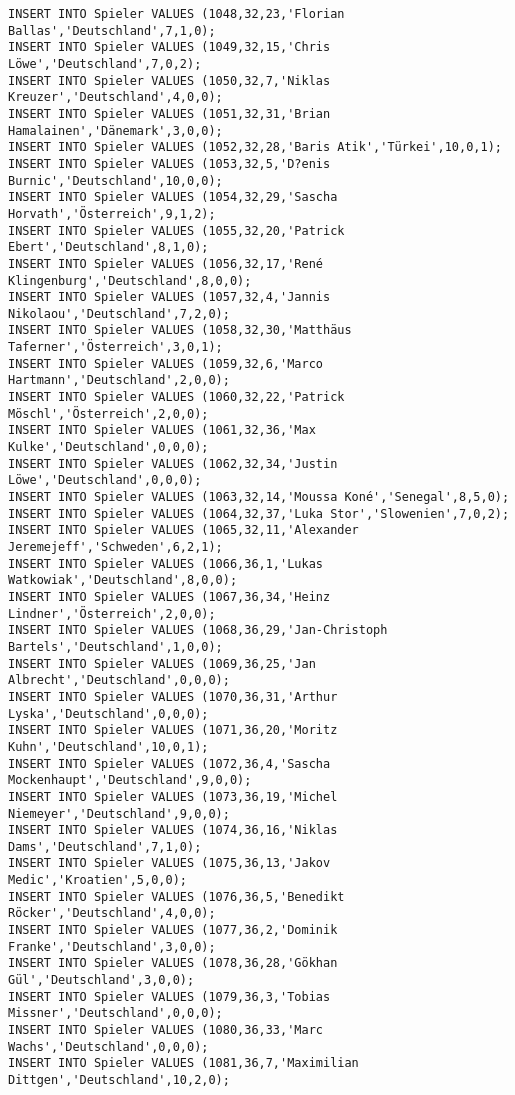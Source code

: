 \documentclass{bschlangaul-aufgabe}
\begin{document}
\begin{verbatim}
INSERT INTO Spieler VALUES (1048,32,23,'Florian Ballas','Deutschland',7,1,0);
INSERT INTO Spieler VALUES (1049,32,15,'Chris Löwe','Deutschland',7,0,2);
INSERT INTO Spieler VALUES (1050,32,7,'Niklas Kreuzer','Deutschland',4,0,0);
INSERT INTO Spieler VALUES (1051,32,31,'Brian Hamalainen','Dänemark',3,0,0);
INSERT INTO Spieler VALUES (1052,32,28,'Baris Atik','Türkei',10,0,1);
INSERT INTO Spieler VALUES (1053,32,5,'D?enis Burnic','Deutschland',10,0,0);
INSERT INTO Spieler VALUES (1054,32,29,'Sascha Horvath','Österreich',9,1,2);
INSERT INTO Spieler VALUES (1055,32,20,'Patrick Ebert','Deutschland',8,1,0);
INSERT INTO Spieler VALUES (1056,32,17,'René Klingenburg','Deutschland',8,0,0);
INSERT INTO Spieler VALUES (1057,32,4,'Jannis Nikolaou','Deutschland',7,2,0);
INSERT INTO Spieler VALUES (1058,32,30,'Matthäus Taferner','Österreich',3,0,1);
INSERT INTO Spieler VALUES (1059,32,6,'Marco Hartmann','Deutschland',2,0,0);
INSERT INTO Spieler VALUES (1060,32,22,'Patrick Möschl','Österreich',2,0,0);
INSERT INTO Spieler VALUES (1061,32,36,'Max Kulke','Deutschland',0,0,0);
INSERT INTO Spieler VALUES (1062,32,34,'Justin Löwe','Deutschland',0,0,0);
INSERT INTO Spieler VALUES (1063,32,14,'Moussa Koné','Senegal',8,5,0);
INSERT INTO Spieler VALUES (1064,32,37,'Luka Stor','Slowenien',7,0,2);
INSERT INTO Spieler VALUES (1065,32,11,'Alexander Jeremejeff','Schweden',6,2,1);
INSERT INTO Spieler VALUES (1066,36,1,'Lukas Watkowiak','Deutschland',8,0,0);
INSERT INTO Spieler VALUES (1067,36,34,'Heinz Lindner','Österreich',2,0,0);
INSERT INTO Spieler VALUES (1068,36,29,'Jan-Christoph Bartels','Deutschland',1,0,0);
INSERT INTO Spieler VALUES (1069,36,25,'Jan Albrecht','Deutschland',0,0,0);
INSERT INTO Spieler VALUES (1070,36,31,'Arthur Lyska','Deutschland',0,0,0);
INSERT INTO Spieler VALUES (1071,36,20,'Moritz Kuhn','Deutschland',10,0,1);
INSERT INTO Spieler VALUES (1072,36,4,'Sascha Mockenhaupt','Deutschland',9,0,0);
INSERT INTO Spieler VALUES (1073,36,19,'Michel Niemeyer','Deutschland',9,0,0);
INSERT INTO Spieler VALUES (1074,36,16,'Niklas Dams','Deutschland',7,1,0);
INSERT INTO Spieler VALUES (1075,36,13,'Jakov Medic','Kroatien',5,0,0);
INSERT INTO Spieler VALUES (1076,36,5,'Benedikt Röcker','Deutschland',4,0,0);
INSERT INTO Spieler VALUES (1077,36,2,'Dominik Franke','Deutschland',3,0,0);
INSERT INTO Spieler VALUES (1078,36,28,'Gökhan Gül','Deutschland',3,0,0);
INSERT INTO Spieler VALUES (1079,36,3,'Tobias Missner','Deutschland',0,0,0);
INSERT INTO Spieler VALUES (1080,36,33,'Marc Wachs','Deutschland',0,0,0);
INSERT INTO Spieler VALUES (1081,36,7,'Maximilian Dittgen','Deutschland',10,2,0);

\end{verbatim}
\end{document}
